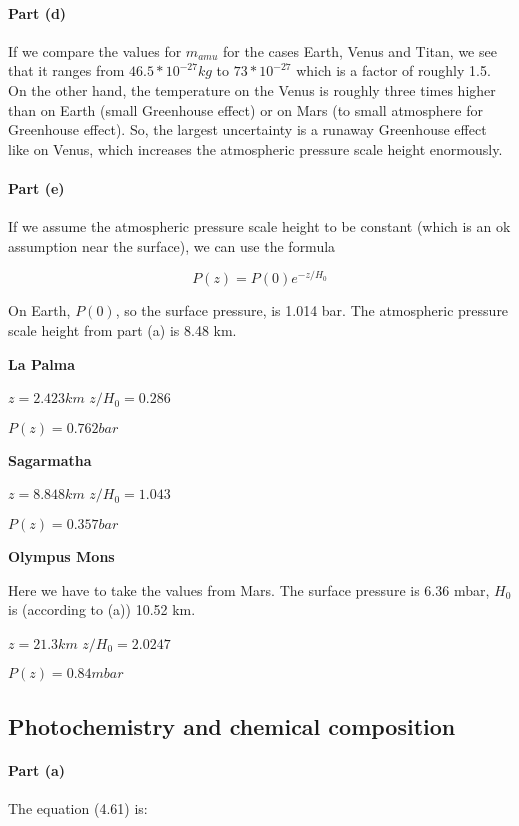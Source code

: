 \documentclass[12pt,a4paper]{article}
\begin{document}
\paragraph{Part (d)}

If we compare the values for $m_{amu}$ for the cases Earth, Venus and Titan, we see that it ranges from $46.5 * 10^{-27} kg$ to $73 * 10^{-27}$ which is a factor of roughly 1.5. On the other hand, the temperature on the Venus is roughly three times higher than on Earth (small Greenhouse effect) or on Mars (to small atmosphere for Greenhouse effect). So, the largest uncertainty is a runaway Greenhouse effect like on Venus, which increases the atmospheric pressure scale height enormously.

\paragraph{Part (e)}

If we assume the atmospheric pressure scale height to be constant (which is an ok assumption near the surface), we can use the formula

$$P(z) = P(0) e^{-z/H_0}$$

On Earth, $P(0)$, so the surface pressure, is 1.014 bar. The atmospheric pressure scale height from part (a) is 8.48 km.

\textbf{La Palma}

$z = 2.423 km$
$z/H_0 = 0.286$

$P(z) = 0.762 bar$

\textbf{Sagarmatha}

$z = 8.848 km$
$z/H_0 = 1.043$

$P(z) = 0.357 bar$

\textbf{Olympus Mons}

Here we have to take the values from Mars. The surface pressure is 6.36 mbar, $H_0$ is (according to (a)) 10.52 km.

$z = 21.3 km$
$z/H_0 = 2.0247$

$P(z) = 0.84 mbar$

\subsection{Photochemistry and chemical composition}

\paragraph{Part (a)}

The equation (4.61) is:
\end{document}

